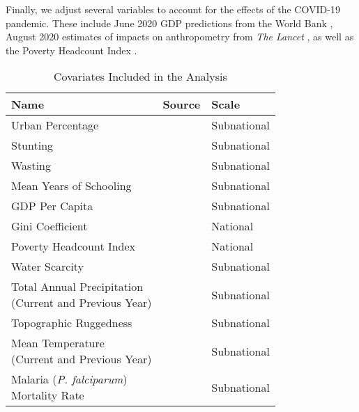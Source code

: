 \documentclass[titlepage]{article}
\begin{document}
Finally, we adjust several variables to account for the effects of the COVID-19 pandemic.  These include June 2020 GDP predictions from the World Bank \cite{prospects2020}, August 2020 estimates of impacts on anthropometry from \textit{The Lancet} \cite{headey2020impacts}, as well as the Poverty Headcount Index \cite{Cuaresma2018}.

\begin{table}[H]
  \centering
	\begin{tabular}{lll}
		\toprule
    Name & Source & Scale \\
		\midrule
    Urban Percentage & \cite{Jones2016} & Subnational \\ [1cm]
    Stunting & \cite{Local2020} & Subnational \\ [1cm]
    Wasting & \cite{Local2020} & Subnational \\ [1cm]
    Mean Years of Schooling & \makecell[tl]{\cite{Smits2019} \\ \cite{KC2017}} & Subnational\\ [1cm]
    GDP Per Capita & \makecell[tl]{\cite{Smits2019} \\ \cite{Dellink2017}} & Subnational \\ [1cm]
    Gini Coefficient & \cite{Rao2019a} & National\\ [1cm]
    Poverty Headcount Index & \cite{Cuaresma2018} & National \\ [1cm]
    Water Scarcity & \cite{greve2018global} & Subnational \\ [1cm]
    \makecell[tl]{Total Annual Precipitation \\ (Current and Previous Year)} & \makecell[tl]{\cite{abatzoglou2018terraclimate} \\ \cite{warszawski2014inter}} & Subnational \\ [1cm]
    Topographic Ruggedness &  \makecell[tl]{\cite{USGS1996} \\ \cite{Riley1999}} & Subnational \\ [1cm]
    \makecell[tl]{Mean Temperature \\ (Current and Previous Year)} &  \makecell[tl]{\cite{abatzoglou2018terraclimate} \\ \cite{warszawski2014inter}} & Subnational \\ [1cm]
    \makecell[tl]{Malaria (\textit{P. falciparum}) \\ Mortality Rate} & \cite{Weiss2019} & Subnational \\
		\bottomrule
	\end{tabular}
	\caption{Covariates Included in the Analysis}
	\label{tab:covars}
\end{table}
\end{document}
